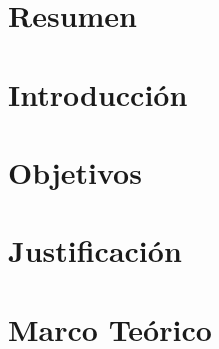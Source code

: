 \documentclass[10pt, letterpaper]{report}
\newcommand{\defaultparformat}[1]{
	{\setlength{\parskip}{2ex}
    }
}
\begin{document}
\ifdefined\CAPcuadros
	\newpage
    \cleardoublepage{}
	\renewcommand{\listtablename}{Lista de Cuadros}
	\listoftables
\fi

\ifdefined\CAPresumen
	\newpage
    \cleardoublepage{}
	\chapter*{Resumen}
	\ifdefined\parpordefecto
		\defaultparformat{resumen}
	\else
		
	\fi
\fi

\ifdefined\CAPintroduccion
	\newpage
	\setcounter{page}{1}
	\chapter{Introducción}
	\ifdefined\parpordefecto
		\defaultparformat{introduccion}
	\else
		
	\fi
\fi

\ifdefined\CAPobjetivos
	\newpage
	\chapter{Objetivos}
	\ifdefined\parpordefecto
		\defaultparformat{objetivos}
	\else
		
	\fi
\fi

\ifdefined\CAPjustificacion
	\newpage
	\chapter{Justificación}
	\ifdefined\parpordefecto
		\defaultparformat{justificacion}
	\else
		
	\fi
\fi

\ifdefined\CAPmarcoteorico
	\newpage
	\chapter{Marco Teórico}
	\ifdefined\parpordefecto
		\defaultparformat{marco_teorico}
	\else
		
	\fi
\fi
\end{document}
